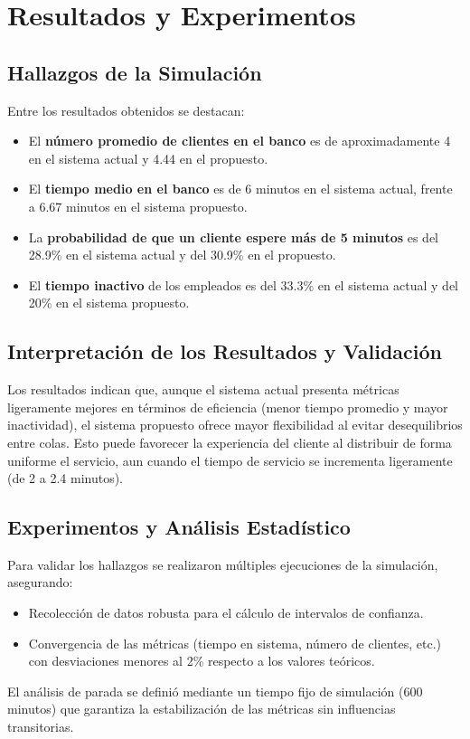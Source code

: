 \documentclass[12pt]{article}
\begin{document}
\section{Resultados y Experimentos}\label{sec:resultados}

\subsection{Hallazgos de la Simulación}
Entre los resultados obtenidos se destacan:
\begin{itemize}
    \item El \textbf{número promedio de clientes en el banco} es de aproximadamente 4 en el sistema actual y 4.44 en el propuesto.
    \item El \textbf{tiempo medio en el banco} es de 6 minutos en el sistema actual, frente a 6.67 minutos en el sistema propuesto.
    \item La \textbf{probabilidad de que un cliente espere más de 5 minutos} es del 28.9\% en el sistema actual y del 30.9\% en el propuesto.
    \item El \textbf{tiempo inactivo} de los empleados es del 33.3\% en el sistema actual y del 20\% en el sistema propuesto.
\end{itemize}

\subsection{Interpretación de los Resultados y Validación}
Los resultados indican que, aunque el sistema actual presenta métricas ligeramente mejores en términos de eficiencia (menor tiempo promedio y mayor inactividad), el sistema propuesto ofrece mayor flexibilidad al evitar desequilibrios entre colas. Esto puede favorecer la experiencia del cliente al distribuir de forma uniforme el servicio, aun cuando el tiempo de servicio se incrementa ligeramente (de 2 a 2.4 minutos).

\subsection{Experimentos y Análisis Estadístico}
Para validar los hallazgos se realizaron múltiples ejecuciones de la simulación, asegurando:
\begin{itemize}
    \item Recolección de datos robusta para el cálculo de intervalos de confianza.
    \item Convergencia de las métricas (tiempo en sistema, número de clientes, etc.) con desviaciones menores al 2\% respecto a los valores teóricos.
\end{itemize}
El análisis de parada se definió mediante un tiempo fijo de simulación (600 minutos) que garantiza la estabilización de las métricas sin influencias transitorias.
\end{document}
